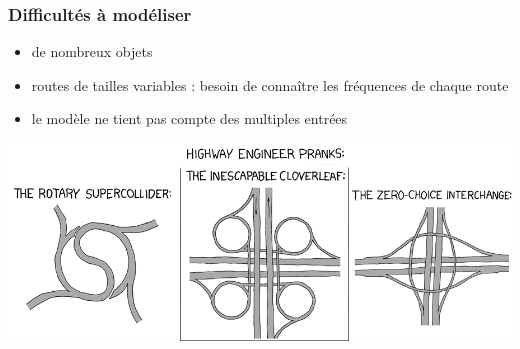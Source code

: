 \documentclass[slidetop,11pt]{beamer}
\begin{document}
\begin{frame}
	\frametitle{Difficultés à modéliser}
	\begin{itemize}
		\item de nombreux objets
		\item routes de tailles variables : besoin de connaître les fréquences de chaque route
		\item le modèle ne tient pas compte des multiples entrées
	\end{itemize}
\end{frame}


\begin{frame}
	\includegraphics[scale=3]{./images/highway-engineers-pranks-hz}
\end{frame}
\end{document}
